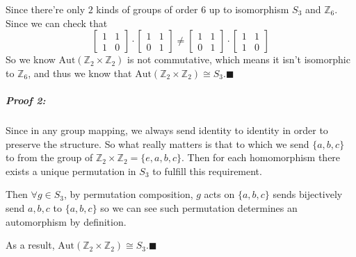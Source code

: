 \documentclass[11pt]{article}
\begin{document}
					Since there're only $2$ kinds of groups of order $6$ up to isomorphism $S_3$ and $\mathbb{Z}_6$. Since we can check that 
						\[
							\begin{bmatrix}
								1 & 1\\
								1 & 0
							\end{bmatrix}
							\cdot
							\begin{bmatrix}
								1 & 1\\
								0 & 1
							\end{bmatrix}
							\neq
							\begin{bmatrix}
								1 & 1\\
								0 & 1
							\end{bmatrix}
							\cdot
							\begin{bmatrix}
								1 & 1\\
								1 & 0
							\end{bmatrix}
						\]
						So we know $\mathrm{Aut}(\mathbb{Z}_2 \times \mathbb{Z}_2)$ is not commutative, which means it isn't isomorphic to $\mathbb{Z}_6$, and thus we know that $\mathrm{Aut}(\mathbb{Z}_2 \times \mathbb{Z}_2) \cong S_3.\blacksquare$
			\subparagraph{Proof 2:} Since in any group mapping, we always send identity to identity in order to preserve the structure. So what really matters is that to which we send $\{a, b, c\}$ to from the group of $\mathbb{Z}_2 \times \mathbb{Z}_2 = \{e, a, b, c\}$. Then for each homomorphism there exists a unique permutation in $S_3$ to fulfill this requirement.
			
			Then $\forall g \in S_3$, by permutation composition, $g$ acts on $\{a, b, c\}$ sends bijectively send $a, b, c$ to $\{a, b, c\}$ so we can see such permutation determines an automorphism by definition.
			
			As a result, $\mathrm{Aut}(\mathbb{Z}_2 \times \mathbb{Z}_2) \cong S_3.\blacksquare$
\end{document}
